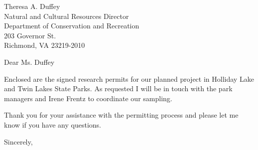 \documentclass[12pt]{letter}
\begin{document}
\begin{letter}{Theresa A. Duffey\\ Natural and Cultural Resources Director\\ Department of Conservation and Recreation\\ 203 Governor St. \\ Richmond, VA 23219-2010}

\opening{Dear Ms. Duffey}

Enclosed are the signed research permits for our planned project in Holliday Lake and Twin Lakes State Parks.  As requested I will be in touch with the park managers and Irene Frentz to coordinate our sampling.  

Thank you for your assistance with the permitting process and please let me know if you have any questions.

\closing{Sincerely,}

\end{letter}
\end{document}
